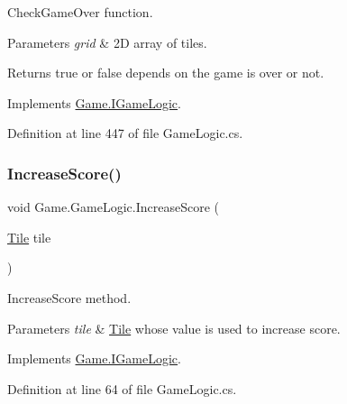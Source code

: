 Check\+Game\+Over function. 


\begin{DoxyParams}{Parameters}
{\em grid} & 2D array of tiles.\\
\hline
\end{DoxyParams}
\begin{DoxyReturn}{Returns}
true or false depends on the game is over or not.
\end{DoxyReturn}


Implements \mbox{\hyperlink{interface_game_1_1_i_game_logic_adad0be2f1112c86b5a0fcaf9862e5947}{Game.\+I\+Game\+Logic}}.



Definition at line 447 of file Game\+Logic.\+cs.

\mbox{\label{class_game_1_1_game_logic_acfdb89870903c5855e4aeb437e9e9672}} 
\subsubsection{\texorpdfstring{IncreaseScore()}{IncreaseScore()}}
{\footnotesize\ttfamily void Game.\+Game\+Logic.\+Increase\+Score (\begin{DoxyParamCaption}\item[{\mbox{\hyperlink{class_game_1_1_tile}{Tile}}}]{tile }\end{DoxyParamCaption})}



Increase\+Score method. 


\begin{DoxyParams}{Parameters}
{\em tile} & \mbox{\hyperlink{class_game_1_1_tile}{Tile}} whose value is used to increase score.\\
\hline
\end{DoxyParams}


Implements \mbox{\hyperlink{interface_game_1_1_i_game_logic_a1a1127f02ceb601a80694ee69e25c0c7}{Game.\+I\+Game\+Logic}}.



Definition at line 64 of file Game\+Logic.\+cs.

\mbox{\label{class_game_1_1_game_logic_a9c5ad5f88426ff3f53252c41611b5ab2}} 
